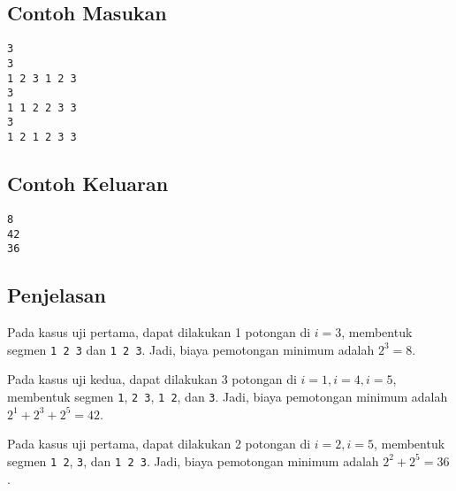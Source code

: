 \documentclass{article}
\begin{document}
\begin{multicols}{2}
\subsection*{Contoh Masukan}
\begin{lstlisting}
3
3
1 2 3 1 2 3
3
1 1 2 2 3 3
3
1 2 1 2 3 3
\end{lstlisting}
\columnbreak
\subsection*{Contoh Keluaran}
\begin{lstlisting}
8
42
36
\end{lstlisting}
\vfill
\null
\end{multicols}

\subsection*{Penjelasan}
Pada kasus uji pertama, dapat dilakukan 1 potongan di $i=3$, membentuk segmen \lstinline{1 2 3} dan \lstinline{1 2 3}.
Jadi, biaya pemotongan minimum adalah $2^3 = 8$.

Pada kasus uji kedua, dapat dilakukan 3 potongan di $i=1, i=4, i=5$, membentuk segmen \lstinline{1}, \lstinline{2 3}, \lstinline{1 2}, dan \lstinline{3}.
Jadi, biaya pemotongan minimum adalah $2^1 + 2^3 + 2^5 = 42$.

Pada kasus uji pertama, dapat dilakukan 2 potongan di $i=2, i=5$, membentuk segmen \lstinline{1 2}, \lstinline{3}, dan \lstinline{1 2 3}.
Jadi, biaya pemotongan minimum adalah $2^2 + 2^5 = 36$.

\pagebreak
\end{document}
